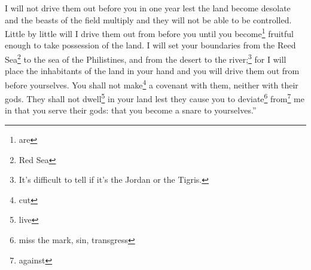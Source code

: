 \begin{enumerate}[align=center]
     I will not drive them out before you in one year lest the land become desolate and the beasts of the field multiply and they will not be able to be controlled.%
     Little by little will I drive them out from before you until you become\footnote{are} fruitful enough to take possession of the land.%
     I will set your boundaries from the Reed Sea\footnote{Red Sea} to the sea of the Philistines, and from the desert to the river;\footnote{It's difficult to tell if it's the Jordan or the Tigris.} for I will place the inhabitants of the land in your hand and you will drive them out from before yourselves.%
     You shall not make\footnote{cut} a covenant with them, neither with their gods.%
     They shall not dwell\footnote{live} in your land lest they cause you to deviate\footnote{miss the mark, sin, transgress} from\footnote{against} me in that you serve their gods: that you become a snare to yourselves.''%
\end{enumerate}
